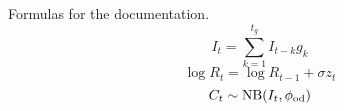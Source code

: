 \documentclass[11pt, oneside]{amsart}   	%
\begin{document}
Formulas for the documentation.
\begin{equation}
I_t = \sum_{k=1}^{t_g} I_{t-k} g_k
\end{equation}
\begin{equation}
\log R_t = \log R_{t-1} + \sigma z_t
\end{equation}
\begin{equation}
C_t \sim {\rm NB}(I_t,\phi_{\rm od})
\end{equation}
\end{document}
